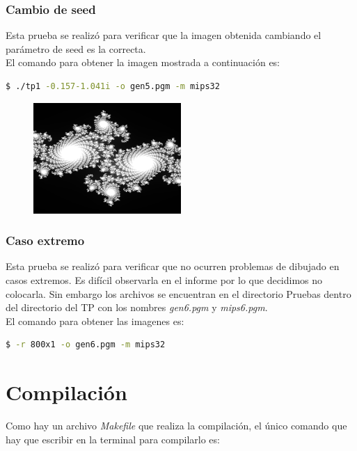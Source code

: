 \documentclass[a4paper,10pt]{article}
\begin{document}
\subsubsection{Cambio de seed}
Esta prueba se realizó para verificar que la imagen obtenida cambiando el parámetro de seed es la correcta. \\
El comando para obtener la imagen mostrada a continuación es:

\begin{lstlisting}[frame = single, language = bash, numbers=none]
$ ./tp1 -0.157-1.041i -o gen5.pgm -m mips32
\end{lstlisting}

\begin{figure}[H]
 \centering
    \includegraphics[width=0.5\textwidth]{../img_informe/uno.png}
\end{figure}

\subsubsection{Caso extremo}
Esta prueba se realizó para verificar que no ocurren problemas de dibujado en casos
extremos. Es difícil observarla en el informe por lo que decidimos no colocarla. Sin embargo los archivos se encuentran en el directorio Pruebas dentro del directorio del TP con los nombres \textit{gen6.pgm} y \textit{mips6.pgm}.\\
El comando para obtener las imagenes es:

\begin{lstlisting}[frame = single, language = bash, numbers=none]
$ -r 800x1 -o gen6.pgm -m mips32
\end{lstlisting}

\section{Compilación}

Como hay un archivo \textit{Makefile} que realiza la compilación, el único comando que hay que escribir en la terminal para compilarlo es:
\end{document}

